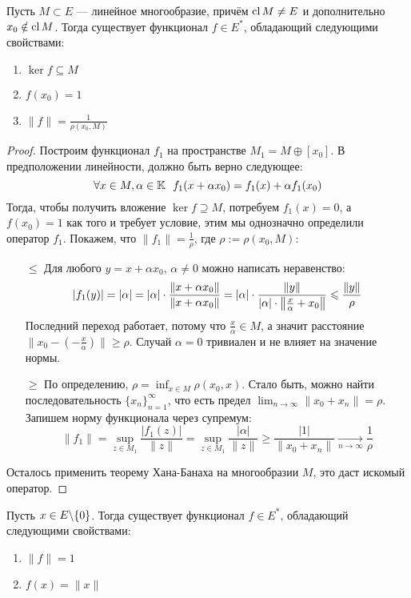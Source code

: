 \begin{corollary}
	Пусть $M \subset E$ --- линейное многообразие, причём $\operatorname{cl} M \neq E$ и дополнительно $x_0 \notin \operatorname{cl} M$. Тогда существует функционал $f \in E^*$, обладающий следующими свойствами:
	\begin{enumerate}
		\item $\ker f \subseteq M$
		
		\item $f(x_0) = 1$
		
		\item $\|f\| = \frac{1}{\rho(x_0, M)}$
	\end{enumerate}
\end{corollary}

\begin{proof}
	Построим функционал $f_1$ на пространстве $M_1 = M \oplus [x_0]$. В предположении линейности, должно быть верно следующее:
	\[
		\forall x \in M, \alpha \in \mathbb{K}\ \ f_1(x + \alpha x_0) = f_1(x) + \alpha f_1(x_0)
	\]
	Тогда, чтобы получить вложение $\ker f \supseteq M$, потребуем $f_1(x) = 0$, а $f(x_0) = 1$ как того и требует условие, этим мы однозначно определили оператор $f_1$. Покажем, что $\|f_1\| = \frac{1}{\rho}$, где $\rho := \rho(x_0, M)$:
	\begin{itemize}
		\item[$\le$] Для любого $y = x + \alpha x_0$, $\alpha \neq 0$ можно написать неравенство:
		\[
			|f_1(y)| = |\alpha| = |\alpha| \cdot \frac{\|x + \alpha x_0\|}{\|x + \alpha x_0\|} = |\alpha| \cdot \frac{\|y\|}{|\alpha| \cdot \left\|\frac{x}{\alpha} + x_0\right\|} \leqslant \frac{\|y\|}{\rho}
		\]
		Последний переход работает, потому что $\frac{x}{\alpha} \in M$, а значит расстояние $\|x_0 - (-\frac{x}{\alpha})\| \ge \rho$. Случай $\alpha = 0$ тривиален и не влияет на значение нормы.
		
		\item[$\ge$] По определению, $\rho = \inf_{x \in M} \rho(x_0, x)$. Стало быть, можно найти последовательность $\{x_n\}_{n = 1}^\infty$, что есть предел $\lim_{n \to \infty} \|x_0 + x_n\| = \rho$. Запишем норму функционала через супремум:
		\[
			\|f_1\| = \sup_{z \in M_1} \frac{|f_1(z)|}{\|z\|} = \sup_{z \in M_1} \frac{|\alpha|}{\|z\|} \ge \frac{|1|}{\|x_0 + x_n\|} \xrightarrow[n \to \infty]{} \frac{1}{\rho}
		\]
	\end{itemize}
	Осталось применить теорему Хана-Банаха на многообразии $M$, это даст искомый оператор.
\end{proof}

\begin{corollary}
	Пусть $x \in E \backslash \{0\}$. Тогда существует функционал $f \in E^*$, обладающий следующими свойствами:
	\begin{enumerate}
		\item $\|f\| = 1$
		
		\item $f(x) = \|x\|$
	\end{enumerate}
\end{corollary}

